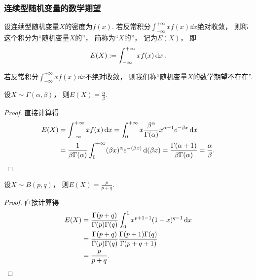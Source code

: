 \subsubsection{连续型随机变量的数学期望}
\begin{definition}
设连续型随机变量\(X\)的密度为\(f(x)\).
若反常积分\(\int_{-\infty}^{+\infty} x f(x) \dd{x}\)绝对收敛，
则称这个积分为“随机变量\(X\)的”，
简称为“\(X\)的”，
记为\(E(X)\)，
即\begin{equation}\label{equation:随机变量的数字特征.连续型数学期望的定义式}
	E(X) := \int_{-\infty}^{+\infty} x f(x) \dd{x}.
\end{equation}

若反常积分\(\int_{-\infty}^{+\infty} x f(x) \dd{x}\)不绝对收敛，
则我们称“随机变量\(X\)的数学期望不存在”.
\end{definition}

\begin{theorem}\label{theorem:随机变量的数字特征.伽马分布的期望}
设\(X \sim \Gamma(\alpha,\beta)\)，
则\(E(X)=\frac{\alpha}{\beta}\).
\begin{proof}
直接计算得\begin{align*}
	E(X)
	&= \int_{-\infty}^{+\infty} x f(x) \dd{x}
	= \int_0^{+\infty} x \frac{\beta^\alpha}{\Gamma(\alpha)} x^{\alpha-1} e^{-\beta x} \dd{x} \\
	&= \frac{1}{\beta \Gamma(\alpha)} \int_0^{+\infty} (\beta x)^\alpha e^{-(\beta x)} \dd(\beta x)
	= \frac{\Gamma(\alpha + 1)}{\beta \Gamma(\alpha)}
	= \frac{\alpha}{\beta}.
	\qedhere
\end{align*}
\end{proof}
\end{theorem}

\begin{theorem}\label{theorem:随机变量的数字特征.贝塔分布的期望}
设\(X \sim B(p,q)\)，
则\(E(X)=\frac{p}{p+q}\).
\begin{proof}
直接计算得\begin{align*}
	E(X) &= \frac{\Gamma(p+q)}{\Gamma(p) \Gamma(q)}
		\int_0^1 x^{p+1-1} (1-x)^{q-1} \dd{x} \\
	&= \frac{\Gamma(p+q)}{\Gamma(p) \Gamma(q)}
		\frac{\Gamma(p+1) \Gamma(q)}{\Gamma(p+q+1)} \\
	&= \frac{p}{p+q}.
	\qedhere
\end{align*}
\end{proof}
\end{theorem}

